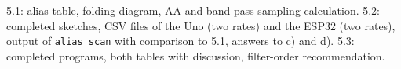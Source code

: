 \begin{deliverables}
5.1: alias table, folding diagram, AA and band-pass sampling calculation.
5.2: completed sketches, CSV files of the Uno (two rates) and the ESP32 (two
rates), output of \texttt{alias\_scan} with comparison to 5.1, answers to c)
and d). 5.3: completed programs, both tables with discussion, filter-order
recommendation.
\end{deliverables}
